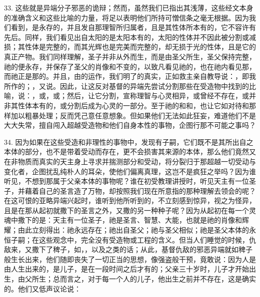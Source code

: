 33. 这些就是异端分子邪恶的诡辩；然而，虽然我们已指出其浅薄，这些经文本身的准确含义和这些比喻的力量，将足以表明他们所持可憎信条之毫无根据。因为我们看到，是永存的，并且发自那理智所归属者，且是其性体所本有的，它不容许有先后。同样，我们看见出自太阳的是太阳本有的，太阳的性体并不因此被分割或减损；其性体是完整的，而其光辉也是完美而完整的，却无损于光的性体，且是它的真正产物。我们同样理解，圣子并非从外而生，而是由圣父所生，圣父保持完整，祂的便永存，并保存了圣父的肖像和不变的，以致凡看见祂的，也在祂内看见那，而祂正是那的。并且，由的运作，我们明了的真实，正如救主亲自教导说：，即我所作的；，又说。因此，让这反对基督的异端先尝试分割那些在受造物中找到的比喻，说：，或，或；然后，让它分割，宣称理智与心灵相异，或曾经不存在，或并非其性体本有的，或分割后成为心灵的一部分。至于祂的和和，也让它如对待和那样加以粗暴处理；反而凭己意任意想象。但如果他们无法如此狂妄，难道他们不是大大失常，擅自闯入超越受造物和他们自身本性的事物，企图行那不可能之事吗？\par

34. 因为如果在这些受造和非理性的事物中，发现有子嗣，它们既不是其所出自之本体的部分，也不是带着受动而存在，更不会损害其来源的本体，那么他们竟然又在非物质而真实的天主身上寻求并揣测部分和受动，将分裂归于那超越一切受动与变化者，企图扰乱纯朴人的耳朵，使他们偏离真理，这岂不是疯狂之举吗？因为谁听见，不想到那属于父亲本体的事物呢？谁在初受教理讲授时，听见天主有一位圣子，并藉着自己的圣言造了万物，却按照我们现在所意指的那种理解去领会的呢？在这可恨的亚略异端兴起时，谁听到他所听到的，不立刻感到惊异，视之为怪异，且是在那从起初就撒下的圣言之外，又撒的另一种种子呢？因为从起初在每一个灵魂中撒下的是：天主有一位圣子，祂是圣言、智慧、大能，也就是祂的肖像和辉耀；由此立刻得出：祂永远存在；祂出自圣父；祂与圣父相似；祂是圣父本体的永恒子嗣；在这些观念中，完全没有受造物或工程的含义。但当人们睡觉的时候，仇敌来，又撒下了稗子，如，，以及之类的话；从此，基督仇敌的邪恶异端就如稗子般生长出来，他们随即丧失了一切正当的思想，像强盗般干预，竟敢说：因为人是由人生出来的，是儿子，是在一段时间之后才有的；父亲三十岁时，儿子才开始出生，由父所生；总而言之，对于每一个人的儿子，他出生之前并不存在，这是确实的。他们又低声议论说：\par

